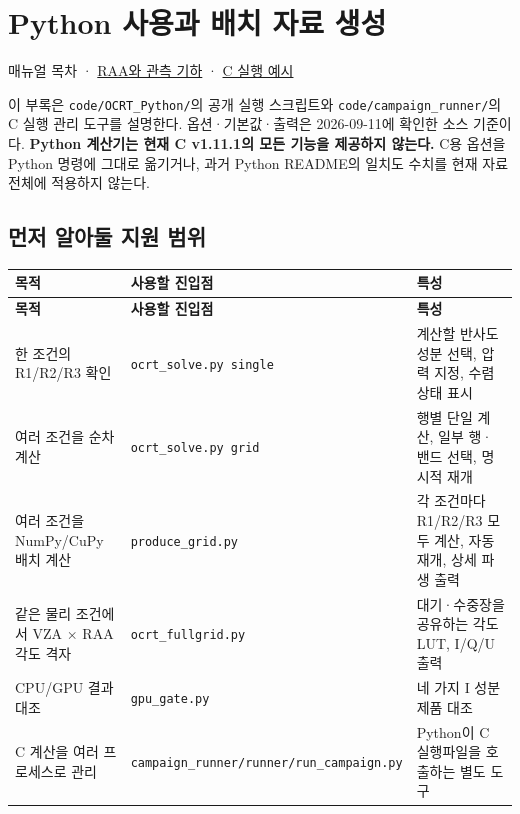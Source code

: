 \chapter{Python 사용과 배치 자료 생성}
\label{chap:06_python_batch}
매뉴얼 목차 · \hyperref[chap:01_concepts_geometry]{RAA와 관측 기하} · \hyperref[chap:04_examples]{C 실행 예시}

이 부록은 \texttt{code/\allowbreak{}OCRT\_\allowbreak{}Python/\allowbreak{}}의 공개 실행 스크립트와 \texttt{code/\allowbreak{}campaign\_\allowbreak{}runner/\allowbreak{}}의 C 실행 관리 도구를 설명한다. 옵션·기본값·출력은 2026-09-11에 확인한 소스 기준이다. \textbf{Python 계산기는 현재 C v1.11.1의 모든 기능을 제공하지 않는다.} C용 옵션을 Python 명령에 그대로 옮기거나, 과거 Python README의 일치도 수치를 현재 자료 전체에 적용하지 않는다.

\section{먼저 알아둘 지원 범위}
\label{sec:auto:06_python_batch:1}

{\TableFont
\begin{longtable}{@{}>{\raggedright\arraybackslash}p{}>{\raggedright\arraybackslash}p{}>{\raggedright\arraybackslash}p{}@{}}
\toprule
\textbf{목적} & \textbf{사용할 진입점} & \textbf{특성} \\
\midrule
\endfirsthead
\toprule
\textbf{목적} & \textbf{사용할 진입점} & \textbf{특성} \\
\midrule
\endhead
\bottomrule
\endfoot
한 조건의 R1/R2/R3 확인 & \texttt{ocrt\_\allowbreak{}solve.\allowbreak{}py single} & 계산할 반사도 성분 선택, 압력 지정, 수렴 상태 표시 \\
여러 조건을 순차 계산 & \texttt{ocrt\_\allowbreak{}solve.\allowbreak{}py grid} & 행별 단일 계산, 일부 행·밴드 선택, 명시적 재개 \\
여러 조건을 NumPy/CuPy 배치 계산 & \texttt{produce\_\allowbreak{}grid.\allowbreak{}py} & 각 조건마다 R1/R2/R3 모두 계산, 자동 재개, 상세 파생 출력 \\
같은 물리 조건에서 VZA \ensuremath{\times} RAA 각도 격자 & \texttt{ocrt\_\allowbreak{}fullgrid.\allowbreak{}py} & 대기·수중장을 공유하는 각도 LUT, I/Q/U 출력 \\
CPU/GPU 결과 대조 & \texttt{gpu\_\allowbreak{}gate.\allowbreak{}py} & 네 가지 I 성분 제품 대조 \\
C 계산을 여러 프로세스로 관리 & \texttt{campaign\_\allowbreak{}runner/\allowbreak{}runner/\allowbreak{}run\_\allowbreak{}campaign.\allowbreak{}py} & Python이 C 실행파일을 호출하는 별도 도구 \\
\end{longtable}
}

